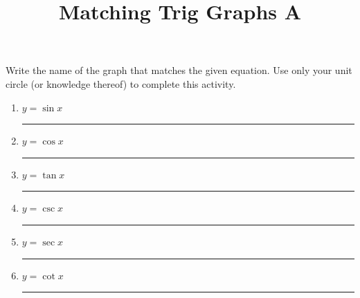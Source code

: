 \documentclass{article}
\begin{document}
\title{Matching Trig Graphs A}
\maketitle
\noindent
Write the name of the graph that matches the given equation. Use only
your unit circle (or knowledge thereof) to complete this activity.
\begin{multicols}{2}
\begin{enumerate}
	\item $y=\sin x$ \hspace{1cm} \rule{5cm}{0.5pt}
	\item $y=\cos x$ \hspace{1cm} \rule{5cm}{0.5pt}
	\item $y=\tan x$ \hspace{1cm} \rule{5cm}{0.5pt}
	\item $y=\csc x$ \hspace{1cm} \rule{5cm}{0.5pt}
	\item $y=\sec x$ \hspace{1cm} \rule{5cm}{0.5pt}
	\item $y=\cot x$ \hspace{1cm} \rule{5cm}{0.5pt}
\end{enumerate}


\end{multicols}
\end{document}
